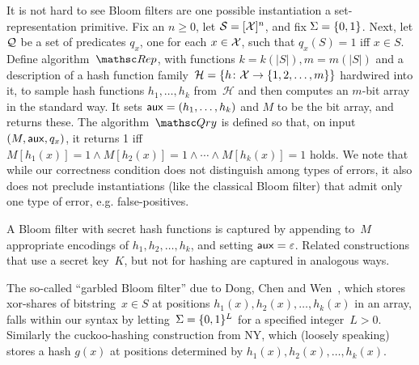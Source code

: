 It is not hard to see Bloom filters are one possible instantiation a set-representation primitive.
Fix an $n \geq 0$, let $\mathcal{S}=[{\cal X}]^n$, and fix $\Sigma=\{0,1\}$.  
Next, let ${\cal Q}$ be a set of predicates $q_x$, one for each $x \in {\cal X}$,
such that $q_x(S)=1$ iff $x \in S$.  Define algorithm~$\Rep$, with functions $k=k(|S|), m=m(|S|)$ and a description of a hash function family~$\mathcal{H}=\{h \colon {\cal X} \to \{1,2,\ldots,m\}\}$ hardwired into it, to sample hash functions $h_1, \ldots, h_k$ from~$\mathcal{H}$ and then computes an $m$-bit array in the standard way. It sets ${\sf aux} = (h_1, \ldots, h_k)$ and $M$ to be the bit array, and returns these.  The algorithm~$\Qry$ is defined so that, on input $(M,{\sf aux},q_x)$, it returns 1 iff $M[h_1(x)]=1 \wedge M[h_2(x)]=1 \wedge \cdots \wedge M[h_k(x)]=1$ holds.
We note that while our correctness condition does not distinguish among types of errors, it also does not preclude instantiations (like the classical Bloom filter) that admit only one type of error, e.g. false-positives.  

A Bloom filter with secret hash functions is captured by appending to~$M$ appropriate encodings of $h_1,h_2,\ldots,h_k$, and setting ${\sf aux}=\varepsilon$.  Related constructions that use a secret key~$K$, but not for hashing are captured in analogous ways.

The so-called ``garbled Bloom filter'' due to Dong, Chen and Wen~\cite{xxx}, which stores xor-shares of bitstring~$x \in S$ at positions $h_1(x),h_2(x),\ldots,h_k(x)$ in an array, falls within our syntax by letting~$\Sigma=\{0,1\}^L$ for a specified integer~$L>0$.  Similarly the cuckoo-hashing construction from NY, which (loosely speaking) stores a hash $g(x)$ at positions determined by $h_1(x),h_2(x),\ldots,h_k(x)$.   

